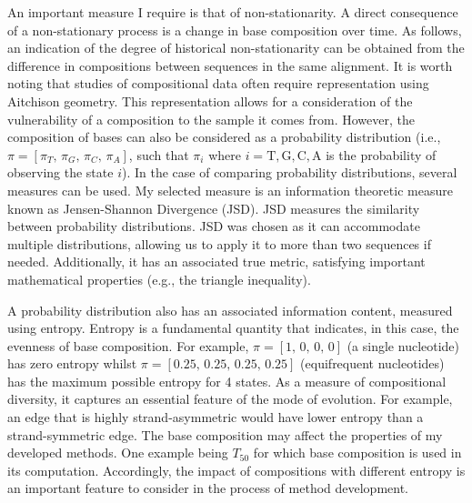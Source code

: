 An important measure I require is that of non-stationarity. A direct consequence of a non-stationary process is a change in base composition over time. As follows, an indication of the degree of historical non-stationarity can be obtained from the difference in compositions between sequences in the same alignment. It is worth noting that studies of compositional data often require representation using Aitchison geometry. This representation allows for a consideration of the vulnerability of a composition to the sample it comes from. However, the composition of bases can also be considered as a probability distribution (i.e., $\pi = [\pi_T,\, \pi_G, \, \pi_C, \, \pi_A]$, such that $\pi_i$ where $i= \mathrm{T}, \mathrm{G}, \mathrm{C}, \mathrm{A}$ is the probability of observing the state $i$). In the case of comparing probability distributions, several measures can be used. My selected measure is an information theoretic measure known as Jensen-Shannon Divergence (JSD). JSD measures the similarity between probability distributions. JSD was chosen as it can accommodate multiple distributions, allowing us to apply it to more than two sequences if needed. Additionally, it has an associated true metric, satisfying important mathematical properties (e.g., the triangle inequality). 

A probability distribution also has an associated information content, measured using entropy. Entropy is a fundamental quantity that indicates, in this case, the evenness of base composition. For example, $\pi =[1,\, 0,\, 0,\, 0]$  (a single nucleotide) has zero entropy whilst  $\pi =[0.25,\, 0.25,\, 0.25,\, 0.25]$ (equifrequent nucleotides) has the maximum possible entropy for 4 states. As a measure of compositional diversity, it captures an essential feature of the mode of evolution. For example, an edge that is highly \gls{strand-asymmetric} would have lower entropy than a \gls{strand-symmetric} edge. The base composition may affect the properties of my developed methods. One example being $T_{50}$ for which base composition is used in its computation. Accordingly, the impact of compositions with different entropy is an important feature to consider in the process of method development.

